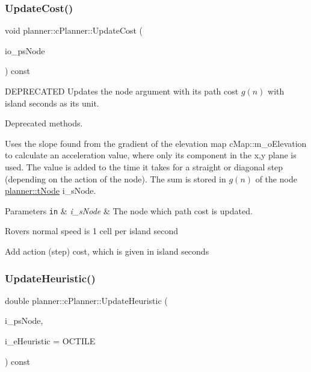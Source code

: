 \subsubsection{\texorpdfstring{Update\+Cost()}{UpdateCost()}}
{\footnotesize\ttfamily void planner\+::c\+Planner\+::\+Update\+Cost (\begin{DoxyParamCaption}\item[{std\+::shared\+\_\+ptr$<$ \mbox{\hyperlink{structplanner_1_1t_node}{t\+Node}} $>$}]{io\+\_\+ps\+Node }\end{DoxyParamCaption}) const}



D\+E\+P\+R\+E\+C\+A\+T\+ED Updates the node argument with its path cost $g(n)$ with island seconds as its unit. 

Deprecated methods.

Uses the slope found from the gradient of the elevation map c\+Map\+::m\+\_\+o\+Elevation to calculate an acceleration value, where only its component in the x,y plane is used. The value is added to the time it takes for a straight or diagonal step (depending on the action of the node). The sum is stored in $g(n)$ of the node \mbox{\hyperlink{structplanner_1_1t_node}{planner\+::t\+Node}} i\+\_\+s\+Node. 
\begin{DoxyParams}[1]{Parameters}
\mbox{\tt in}  & {\em i\+\_\+s\+Node} & The node which path cost is updated. \\
\hline
\end{DoxyParams}
Rover\textquotesingle{}s normal speed is 1 cell per island second

Add action (step) cost, which is given in island seconds \mbox{\label{classplanner_1_1c_planner_ab7cc7c2666de2e49f745901080aac147}} 
\subsubsection{\texorpdfstring{Update\+Heuristic()}{UpdateHeuristic()}}
{\footnotesize\ttfamily double planner\+::c\+Planner\+::\+Update\+Heuristic (\begin{DoxyParamCaption}\item[{std\+::shared\+\_\+ptr$<$ \mbox{\hyperlink{structplanner_1_1t_node}{t\+Node}} $>$}]{i\+\_\+ps\+Node,  }\item[{const \mbox{\hyperlink{classplanner_1_1c_planner_a7f6dc4cbb69dd1ede14a67b0a7bd425b}{t\+Heuristic}}}]{i\+\_\+e\+Heuristic = {\ttfamily OCTILE} }\end{DoxyParamCaption}) const}



